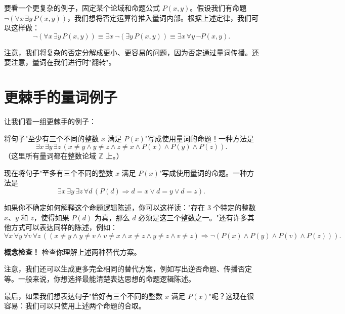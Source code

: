 \documentclass[11pt]{article}
\begin{document}
要看一个更复杂的例子，固定某个论域和命题公式 $P(x, y)$。假设我们有命题 $\neg(\forall x\,\exists y\,P(x, y))$，我们想将否定运算符推入量词内部。根据上述定律，我们可以这样做：
\[
\neg(\forall x\,\exists y\,P(x, y)) \equiv \exists x\,\neg(\exists y\,P(x, y)) \equiv \exists x\,\forall y\,\neg P(x, y).
\]

注意，我们将复杂的否定分解成更小、更容易的问题，因为否定通过量词传播。还要注意，量词在我们进行时"翻转"。

\section{更棘手的量词例子}

让我们看一组更棘手的例子：

将句子"至少有三个不同的整数 $x$ 满足 $P(x)$"写成使用量词的命题！一种方法是
\[
\exists x\,\exists y\,\exists z\,(x \neq y \land y \neq z \land z \neq x \land P(x) \land P(y) \land P(z)).
\]
（这里所有量词都在整数论域 $\mathbb{Z}$ 上。）

现在将句子"至多有三个不同的整数 $x$ 满足 $P(x)$"写成使用量词的命题。一种方法是
\[
\exists x\,\exists y\,\exists z\,\forall d\,(P(d) \Rightarrow d = x \lor d = y \lor d = z).
\]

如果你不确定如何解释这个命题逻辑陈述，你可以这样读："存在 3 个特定的整数 $x$、$y$ 和 $z$，使得如果 $P(d)$ 为真，那么 $d$ 必须是这三个整数之一。"还有许多其他方式可以表达同样的陈述，例如：
\[
\forall x\,\forall y\,\forall v\,\forall z\,((x \neq y \land y \neq v \land v \neq x \land x \neq z \land y \neq z \land v \neq z) \Rightarrow \neg(P(x) \land P(y) \land P(v) \land P(z))).
\]

\textbf{概念检查！} 检查你理解上述两种替代方案。

注意，我们还可以生成更多完全相同的替代方案，例如写出逆否命题、传播否定等。一般来说，你想选择最能清楚表达思想的命题逻辑陈述。

最后，如果我们想表达句子"恰好有三个不同的整数 $x$ 满足 $P(x)$"呢？这现在很容易：我们可以只使用上述两个命题的合取。
\end{document}
